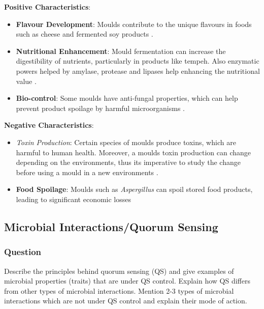 \textbf{Positive Characteristics}:
\begin{itemize}
    \item \textbf{Flavour Development}: Moulds contribute to the unique flavours in foods such as cheese and fermented soy products \cite*{LS03}.
    \item \textbf{Nutritional Enhancement}: Mould fermentation can increase the digestibility of nutrients, particularly in products like tempeh. Also enzymatic powers helped by amylase, protease and lipases help enhancing the nutritional value \cite*{L1-DiversityMicro,LS03}.
    \item \textbf{Bio-control}: Some moulds have anti-fungal properties, which can help prevent product spoilage by harmful microorganisms \cite*{L1-DiversityMicro}.
\end{itemize}

\vspace{0.5em}  
\textbf{Negative Characteristics}:
\begin{itemize}
    \item \textit{Toxin Production}: Certain species of moulds produce toxins, which are harmful to human health. Moreover, a moulds toxin production can change depending on the environments, thus its imperative to study the change before using a mould in a new environments \cite*{LS03}.
    \item \textbf{Food Spoilage}: Moulds such as \textit{Aspergillus} can spoil stored food products, leading to significant economic losses \cite*{L1-DiversityMicro}
\end{itemize}

\subsection{Microbial Interactions/Quorum Sensing}
\subsubsection*{Question}
Describe the principles behind quorum sensing (QS) and give examples of microbial properties (traits) that are under QS control. Explain how QS differs from other types of microbial interactions. Mention 2-3 types of microbial interactions which are not under QS control and explain their mode of action.  


